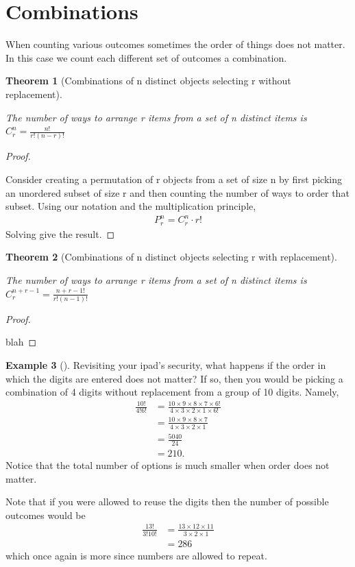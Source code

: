 \documentclass[10pt,]{book}
\theoremstyle{plain}
\newtheorem{theorem}{Theorem}[section]
\theoremstyle{definition}
\theoremstyle{definition}
\newtheorem{example}[theorem]{Example}
\numberwithin{equation}{section}
\begin{document}
\section[Combinations]{Combinations}\label{section-15}
When counting various outcomes sometimes the order of things does not matter.
In this case we count each different set of outcomes a combination. %
\begin{theorem}[Combinations of n distinct objects selecting r without replacement]\label{theorem-13}

			The number of ways to arrange r items from a set of n distinct items 
			is \( C_r^n = \frac{n!}{r!(n-r)!} \)
\end{theorem}
\begin{proof}\hypertarget{proof-9}{}

			Consider creating a permutation of r objects from a set of size n
			by first picking an unordered subset of size r and then counting 
			the number of ways to order that subset. Using our notation and the
			multiplication principle,
			\begin{gather*}
P_r^n = C_r^n \cdot r!
\end{gather*}
			Solving give the result.
\end{proof}
\begin{theorem}[Combinations of n distinct objects selecting r with replacement]\label{theorem-14}

			The number of ways to arrange r items from a set of n distinct items 
			is \( C_r^{n+r-1} = \frac{n+r-1!}{r!(n-1)!} \)
\end{theorem}
\begin{proof}\hypertarget{proof-10}{}

			blah
\end{proof}
\begin{example}[]\label{example-11}
Revisiting your ipad's security, what happens if the order in which the digits are entered does not matter? If so, then you would be picking a combination of 4 digits without replacement from a group of 10 digits. Namely, 
		\begin{align*}
\frac{10!}{4!6!} & = \frac{10 \times 9 \times 8 \times 7 \times 6!}{4 \times 3 \times 2 \times 1 \times 6!}\\
& = \frac{10 \times 9 \times 8 \times 7}{4 \times 3 \times 2 \times 1}\\
& = \frac{5040}{24}\\
& = 210.
\end{align*}
		Notice that the total number of options is much smaller when order does not matter.
\par

		Note that if you were allowed to reuse the digits then the number of possible outcomes would be
		\begin{align*}
\frac{13!}{3!10!} & = \frac{13 \times 12 \times 11}{3 \times 2 \times 1} \\
 & = 286
\end{align*}
		which once again is more since numbers are allowed to repeat.
\end{example}
\end{document}
